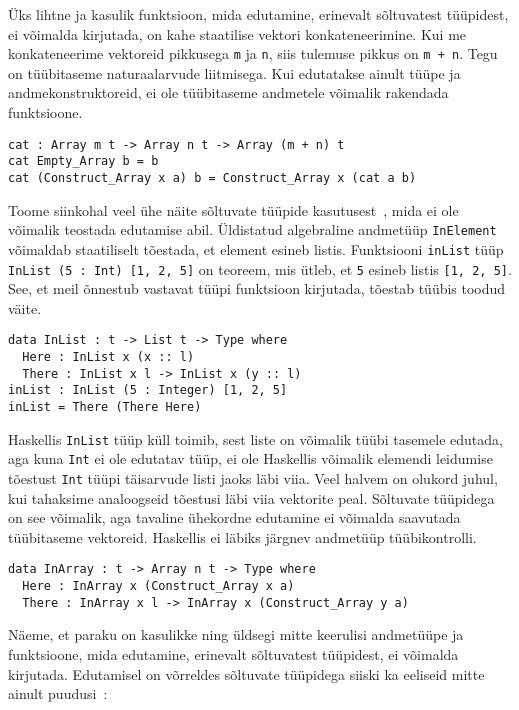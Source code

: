 \documentclass[12pt]{article}
\begin{document}
      Üks lihtne ja kasulik funktsioon, mida edutamine, erinevalt sõltuvatest tüüpidest, ei võimalda kirjutada, on kahe staatilise vektori konkateneerimine. Kui me konkateneerime vektoreid pikkusega \verb!m! ja \verb!n!, siis tulemuse pikkus on \verb!m + n!. Tegu on tüübitaseme naturaalarvude liitmisega. Kui edutatakse ainult tüüpe ja andmekonstruktoreid, ei ole tüübitaseme andmetele võimalik rakendada funktsioone.

      \begin{verbatim}cat : Array m t -> Array n t -> Array (m + n) t
cat Empty_Array b = b
cat (Construct_Array x a) b = Construct_Array x (cat a b)\end{verbatim}

      Toome siinkohal veel ühe näite sõltuvate tüüpide kasutusest~\cite{The_Idr}, mida ei ole võimalik teostada edutamise abil. Üldistatud algebraline andmetüüp \verb!InElement! võimaldab staatiliselt tõestada, et element esineb listis. Funktsiooni \verb!inList! tüüp \verb!InList (5 : Int) [1, 2, 5]! on teoreem, mis ütleb, et \verb!5! esineb listis \verb![1, 2, 5]!. See, et meil õnnestub vastavat tüüpi funktsioon kirjutada, tõestab tüübis toodud väite.

      \begin{verbatim}data InList : t -> List t -> Type where
  Here : InList x (x :: l)
  There : InList x l -> InList x (y :: l)
inList : InList (5 : Integer) [1, 2, 5]
inList = There (There Here)\end{verbatim}

      Haskellis \verb!InList! tüüp küll toimib, sest liste on võimalik tüübi tasemele edutada, aga kuna \verb!Int! ei ole edutatav tüüp, ei ole Haskellis võimalik elemendi leidumise tõestust \verb!Int! tüüpi täisarvude listi jaoks läbi viia. Veel halvem on olukord juhul, kui tahaksime analoogseid tõestusi läbi viia vektorite peal. Sõltuvate tüüpidega on see võimalik, aga tavaline ühekordne edutamine ei võimalda saavutada tüübitaseme vektoreid. Haskellis ei läbiks järgnev andmetüüp tüübikontrolli.

      \begin{verbatim}data InArray : t -> Array n t -> Type where
  Here : InArray x (Construct_Array x a)
  There : InArray x l -> InArray x (Construct_Array y a)\end{verbatim}

      Näeme, et paraku on kasulikke ning üldsegi mitte keerulisi andmetüüpe ja funktsioone, mida edutamine, erinevalt sõltuvatest tüüpidest, ei võimalda kirjutada. Edutamisel on võrreldes sõltuvate tüüpidega siiski ka eeliseid mitte ainult puudusi~\cite{Giv}:
\end{document}
